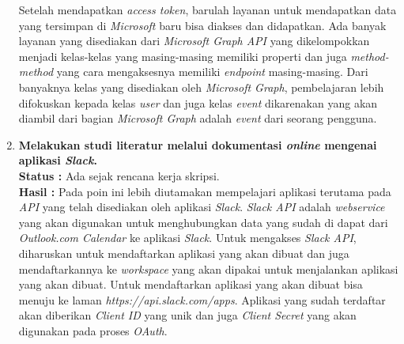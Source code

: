 \documentclass[a4paper,twoside]{article}
\begin{document}
\begin{enumerate}
		Setelah mendapatkan \textit{access token}, barulah layanan untuk mendapatkan data yang tersimpan di \textit{Microsoft} baru bisa diakses dan didapatkan. Ada banyak layanan yang disediakan dari \textit{Microsoft Graph API} yang dikelompokkan menjadi kelas-kelas yang masing-masing memiliki properti dan juga \textit{method-method} yang cara mengaksesnya memiliki \textit{endpoint} masing-masing. Dari banyaknya kelas yang disediakan oleh \textit{Microsoft Graph}, pembelajaran lebih difokuskan kepada kelas \textit{user} dan juga kelas \textit{event} dikarenakan yang akan diambil dari bagian \textit{Microsoft Graph} adalah \textit{event} dari seorang pengguna. 

		\item \textbf{Melakukan studi literatur melalui dokumentasi \textit{online} mengenai aplikasi \textit{Slack}.}\\
		{\bf Status :} Ada sejak rencana kerja skripsi.\\
		{\bf Hasil :} Pada poin ini lebih diutamakan mempelajari aplikasi terutama pada \textit{API} yang telah disediakan oleh aplikasi \textit{Slack}. \textit{Slack API} adalah \textit{webservice} yang akan digunakan untuk menghubungkan data yang sudah di dapat dari \textit{Outlook.com Calendar} ke aplikasi \textit{Slack}. Untuk mengakses \textit{Slack API}, diharuskan untuk mendaftarkan aplikasi yang akan dibuat dan juga mendaftarkannya ke \textit{workspace} yang akan dipakai untuk menjalankan aplikasi yang akan dibuat. Untuk mendaftarkan aplikasi yang akan dibuat bisa menuju ke laman \textit{https://api.slack.com/apps}. Aplikasi yang sudah terdaftar akan diberikan \textit{Client ID} yang unik dan juga \textit{Client Secret} yang akan digunakan pada proses \textit{OAuth}. 
		

\end{enumerate}
\end{document}
